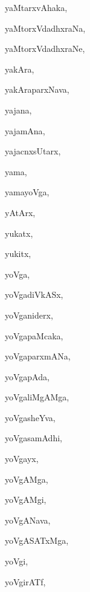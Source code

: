 \begin{multicols}{3}
{\bigskip
\noindent
{}
\smallskip

\noindent
{yaMtarxvAhaka}, \pageref{yaMtarxvAhaka}

\noindent
{yaMtorxVdadhxraNa}, \pageref{yaMtorxVdadhxraNa}

\noindent
{yaMtorxVdadhxraNe}, \pageref{yaMtorxVdadhxraNe}

\noindent
{yakAra}, \pageref{yakAra}

\noindent
{yakAraparxNava}, \pageref{yakAraparxNava}

\noindent
{yajana}, \pageref{yajana}

\noindent
{yajamAna}, \pageref{yajamAna}

\noindent
{yajacnxsUtarx}, \pageref{yajacnxsUtarx}

\noindent
{yama}, \pageref{yama}

\noindent
{yamayoVga}, \pageref{yamayoVga}

\noindent
{yAtArx}, \pageref{yAtArx}

\noindent
{yukatx}, \pageref{yukatx}

\noindent
{yukitx}, \pageref{yukitx}

\noindent
{yoVga}, \pageref{yoVga}

\noindent
{yoVgadiVkASx}, \pageref{yoVgadiVkASx}

\noindent
{yoVganiderx}, \pageref{yoVganiderx}

\noindent
{yoVgapaMcaka}, \pageref{yoVgapaMcaka}

\noindent
{yoVgaparxmANa}, \pageref{yoVgaparxmANa}

\noindent
{yoVgapAda}, \pageref{yoVgapAda}

\noindent
{yoVgaliMgAMga}, \pageref{yoVgaliMgAMga}

\noindent
{yoVgasheYva}, \pageref{yoVgasheYva}

\noindent
{yoVgasamAdhi}, \pageref{yoVgasamAdhi}

\noindent
{yoVgayx}, \pageref{yoVgayx}

\noindent
{yoVgAMga}, \pageref{yoVgAMga}

\noindent
{yoVgAMgi}, \pageref{yoVgAMgi}

\noindent
{yoVgANava}, \pageref{yoVgANava}

\noindent
{yoVgASATxMga}, \pageref{yoVgASATxMga}

\noindent
{yoVgi}, \pageref{yoVgi}

\noindent
{yoVgirATf}, \pageref{yoVgirATf}

\bigskip
\noindent
{}
\smallskip

}
\end{multicols}
